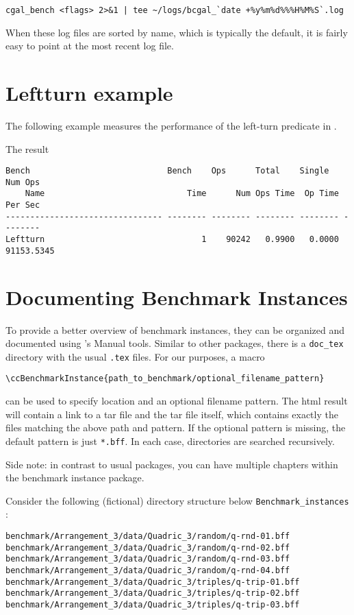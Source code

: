 \begin{verbatim}
cgal_bench <flags> 2>&1 | tee ~/logs/bcgal_`date +%y%m%d%%%H%M%S`.log
\end{verbatim}

When these log files are sorted by name, which is typically the
default, it is fairly easy to point at the most recent log file.

\section{Leftturn example}
The following example measures the performance of the left-turn predicate
in \cgal.

The result
\begin{verbatim}
Bench                            Bench    Ops      Total    Single   Num Ops
    Name                             Time      Num Ops Time  Op Time  Per Sec
-------------------------------- -------- -------- -------- -------- --------
Leftturn                                1    90242   0.9900   0.0000 91153.5345
\end{verbatim}

\section{Documenting Benchmark Instances}

To provide a better overview of benchmark instances, they can be organized and documented using \cgal{}'s Manual tools. Similar to other \cgal packages, there is a \verb+doc_tex+ directory with the usual \verb+.tex+ files. For our purposes, a macro

\verb+\ccBenchmarkInstance{path_to_benchmark/optional_filename_pattern}+

can be used to specify location and an optional filename pattern. The html result will contain a link to a tar file and the tar file itself, which contains exactly the files matching the above path and pattern. If the optional pattern is missing, the default pattern is just \verb+*.bff+. In each case, directories are searched recursively.

Side note: in contrast to usual \cgal{} packages, you can have multiple chapters within the benchmark instance package.

\ccExample

Consider the following (fictional) directory structure below \verb+Benchmark_instances+ :
\begin{verbatim}
benchmark/Arrangement_3/data/Quadric_3/random/q-rnd-01.bff
benchmark/Arrangement_3/data/Quadric_3/random/q-rnd-02.bff
benchmark/Arrangement_3/data/Quadric_3/random/q-rnd-03.bff
benchmark/Arrangement_3/data/Quadric_3/random/q-rnd-04.bff
benchmark/Arrangement_3/data/Quadric_3/triples/q-trip-01.bff
benchmark/Arrangement_3/data/Quadric_3/triples/q-trip-02.bff
benchmark/Arrangement_3/data/Quadric_3/triples/q-trip-03.bff
\end{verbatim}

